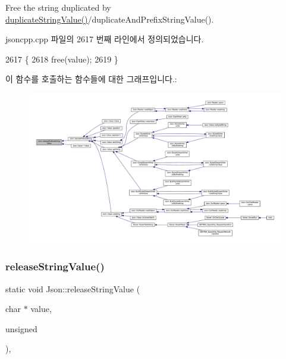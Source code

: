Free the string duplicated by \hyperlink{namespace_json_a678ac3a60cd70ec0fb4c9abfd40eb0c4}{duplicate\+String\+Value()}/duplicate\+And\+Prefix\+String\+Value(). 

jsoncpp.\+cpp 파일의 2617 번째 라인에서 정의되었습니다.


\begin{DoxyCode}
2617                                                            \{
2618   free(value);
2619 \}
\end{DoxyCode}
이 함수를 호출하는 함수들에 대한 그래프입니다.\+:\nopagebreak
\begin{figure}[H]
\begin{center}
\leavevmode
\includegraphics[width=350pt]{namespace_json_a48f4e3ea655e3b4a5d7f892c81f00511_icgraph}
\end{center}
\end{figure}
\mbox{\label{namespace_json_a3e0d81d514d0e8bddf33b08074214abd}} 
\subsubsection{\texorpdfstring{release\+String\+Value()}{releaseStringValue()}}
{\footnotesize\ttfamily static void Json\+::release\+String\+Value (\begin{DoxyParamCaption}\item[{char $\ast$}]{value,  }\item[{unsigned}]{ }\end{DoxyParamCaption})\hspace{0.3cm}{\ttfamily [inline]}, {\ttfamily [static]}}



